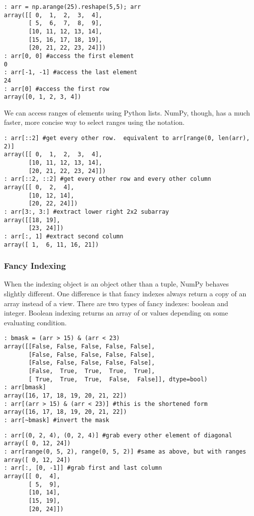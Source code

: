 \begin{lstlisting}
: arr = np.arange(25).reshape(5,5); arr
array([[ 0,  1,  2,  3,  4],
       [ 5,  6,  7,  8,  9],
       [10, 11, 12, 13, 14],
       [15, 16, 17, 18, 19],
       [20, 21, 22, 23, 24]])
: arr[0, 0] #access the first element
0
: arr[-1, -1] #access the last element
24
: arr[0] #access the first row
array([0, 1, 2, 3, 4])
\end{lstlisting}

We can access ranges of elements using Python lists.  NumPy, though, has a much faster, more concise way to select ranges using the  notation.

\begin{lstlisting}
: arr[::2] #get every other row.  equivalent to arr[range(0, len(arr), 2)]
array([[ 0,  1,  2,  3,  4],
       [10, 11, 12, 13, 14],
       [20, 21, 22, 23, 24]])
: arr[::2, ::2] #get every other row and every other column
array([[ 0,  2,  4],
       [10, 12, 14],
       [20, 22, 24]])
: arr[3:, 3:] #extract lower right 2x2 subarray
array([[18, 19],
       [23, 24]])
: arr[:, 1] #extract second column
array([ 1,  6, 11, 16, 21])
\end{lstlisting}

\subsubsection*{Fancy Indexing}
When the indexing object is an object other than a tuple, NumPy behaves slightly different.  One difference is that fancy indexes always return a copy of an array instead of a view.  There are two types of fancy indexes: boolean and integer.  Boolean indexing returns an array of  or  values depending on some evaluating condition.

\begin{lstlisting}
: bmask = (arr > 15) & (arr < 23)
array([[False, False, False, False, False],
       [False, False, False, False, False],
       [False, False, False, False, False],
       [False,  True,  True,  True,  True],
       [ True,  True,  True,  False,  False]], dtype=bool)
: arr[bmask]
array([16, 17, 18, 19, 20, 21, 22])
: arr[(arr > 15) & (arr < 23)] #this is the shortened form
array([16, 17, 18, 19, 20, 21, 22])
: arr[~bmask] #invert the mask
\end{lstlisting}

\begin{lstlisting}
: arr[(0, 2, 4), (0, 2, 4)] #grab every other element of diagonal
array([ 0, 12, 24])
: arr[range(0, 5, 2), range(0, 5, 2)] #same as above, but with ranges
array([ 0, 12, 24])
: arr[:, [0, -1]] #grab first and last column
array([[ 0,  4],
       [ 5,  9],
       [10, 14],
       [15, 19],
       [20, 24]])
\end{lstlisting}

